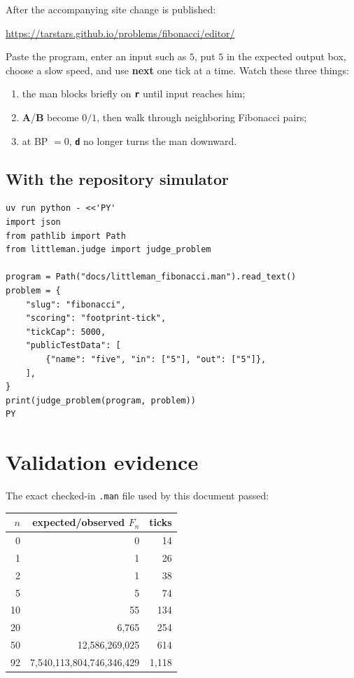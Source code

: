 \documentclass[11pt,a4paper]{article}
\newcommand{\op}[1]{\texttt{\bfseries #1}}
\newcommand{\reg}[1]{\textsf{\bfseries #1}}
\newcommand{\Fib}[1]{F_{#1}}
\begin{document}
After the accompanying site change is published:

\begin{center}
  \url{https://tarstars.github.io/problems/fibonacci/editor/}
\end{center}

Paste the program, enter an input such as \(5\), put \(5\) in the expected
output box, choose a slow speed, and use \textbf{next} one tick at a time.
Watch these three things:

\begin{enumerate}
  \item the man blocks briefly on \op{r} until input reaches him;
  \item \reg{A}/\reg{B} become \(0/1\), then walk through neighboring
        Fibonacci pairs;
  \item at BP \(=0\), \op{d} no longer turns the man downward.
\end{enumerate}

\subsection{With the repository simulator}

\begin{Verbatim}[fontsize=\small]
uv run python - <<'PY'
import json
from pathlib import Path
from littleman.judge import judge_problem

program = Path("docs/littleman_fibonacci.man").read_text()
problem = {
    "slug": "fibonacci",
    "scoring": "footprint-tick",
    "tickCap": 5000,
    "publicTestData": [
        {"name": "five", "in": ["5"], "out": ["5"]},
    ],
}
print(judge_problem(program, problem))
PY
\end{Verbatim}

\section{Validation evidence}

The exact checked-in \texttt{.man} file used by this document passed:

\begin{center}
\begin{tabular}{r|r|r}
  \toprule
  \(n\) & expected/observed \(\Fib n\) & ticks\\
  \midrule
  0  & 0 & 14\\
  1  & 1 & 26\\
  2  & 1 & 38\\
  5  & 5 & 74\\
  10 & 55 & 134\\
  20 & 6,765 & 254\\
  50 & 12,586,269,025 & 614\\
  92 & 7,540,113,804,746,346,429 & 1,118\\
  \bottomrule
\end{tabular}
\end{center}
\end{document}
